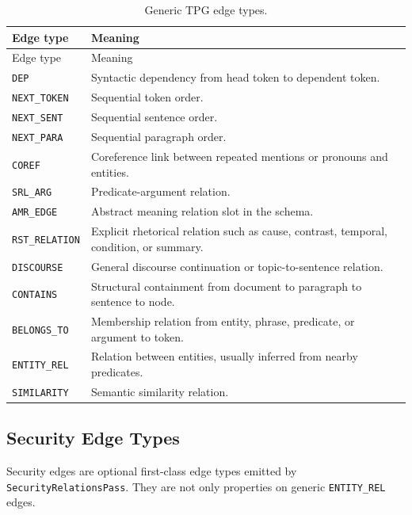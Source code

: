 \documentclass[11pt]{article}
\begin{document}
\begin{longtable}{lp{}}
\caption{Generic TPG edge types.}\\
\toprule
Edge type & Meaning \\
\midrule
\endfirsthead
\toprule
Edge type & Meaning \\
\midrule
\endhead
\bottomrule
\endfoot
\texttt{DEP} & Syntactic dependency from head token to dependent token. \\
\texttt{NEXT\_TOKEN} & Sequential token order. \\
\texttt{NEXT\_SENT} & Sequential sentence order. \\
\texttt{NEXT\_PARA} & Sequential paragraph order. \\
\texttt{COREF} & Coreference link between repeated mentions or pronouns and entities. \\
\texttt{SRL\_ARG} & Predicate-argument relation. \\
\texttt{AMR\_EDGE} & Abstract meaning relation slot in the schema. \\
\texttt{RST\_RELATION} & Explicit rhetorical relation such as cause, contrast, temporal, condition, or summary. \\
\texttt{DISCOURSE} & General discourse continuation or topic-to-sentence relation. \\
\texttt{CONTAINS} & Structural containment from document to paragraph to sentence to node. \\
\texttt{BELONGS\_TO} & Membership relation from entity, phrase, predicate, or argument to token. \\
\texttt{ENTITY\_REL} & Relation between entities, usually inferred from nearby predicates. \\
\texttt{SIMILARITY} & Semantic similarity relation. \\
\end{longtable}

\subsection{Security Edge Types}

Security edges are optional first-class edge types emitted by
\texttt{SecurityRelationsPass}. They are not only properties on generic
\texttt{ENTITY\_REL} edges.
\end{document}
